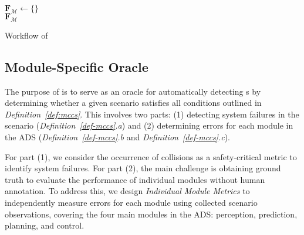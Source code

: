 \begin{algorithm}[!t]
\small
{}
$\mathbf{F}_{\mathcal{M}} \gets \{\}$ \\
\Return $\mathbf{F}_{\mathcal{M}}$
\caption{Workflow of \tool}
\label{algo:workflow}
\end{algorithm}

\subsection{Module-Specific Oracle}
The purpose of \oracle is to serve as an oracle for automatically detecting {\mccs}s by determining whether a given scenario satisfies all conditions outlined in \textit{Definition~\ref{def:mccs}}. This involves two parts: (1) detecting system failures in the scenario (\textit{Definition~\ref{def-mccs}.a}) and (2) determining errors for each module in the ADS (\textit{Definition~\ref{def-mccs}.b} and \textit{Definition~\ref{def-mccs}.c}).

For part (1), we consider the occurrence of collisions as a safety-critical metric to identify system failures.
For part (2), the main challenge is obtaining ground truth to evaluate the performance of individual modules without human annotation. To address this, we design \textit{Individual Module Metrics} to independently measure errors for each module using collected scenario observations, covering the four main modules in the ADS: perception, prediction, planning, and control.

